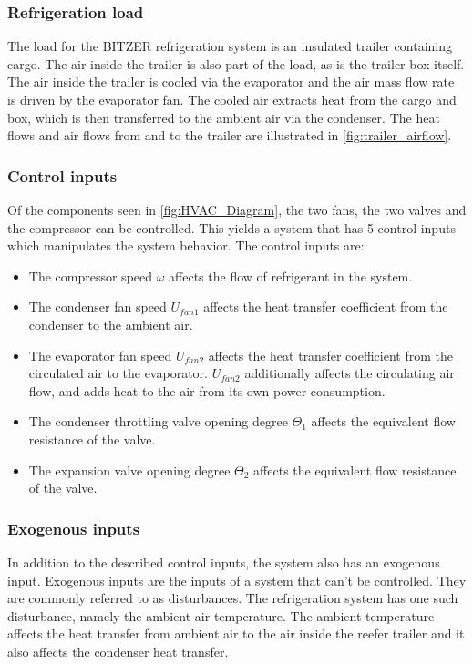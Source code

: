 \subsubsection{Refrigeration load}
The load for the BITZER refrigeration system is an insulated trailer containing cargo. The air inside the trailer is also part of the load, as is the trailer box itself. The air inside the trailer is cooled via the evaporator and the air mass flow rate is driven by the evaporator fan. The cooled air extracts heat from the cargo and box, which is then transferred to the ambient air via the condenser. The heat flows and air flows from and to the trailer are illustrated in \cref{fig:trailer_airflow}.

\subsubsection{Control inputs}
Of the components seen in \cref{fig:HVAC_Diagram}, the two fans, the two valves and the compressor can be controlled. This yields a system that has 5 control inputs which manipulates the system behavior. The control inputs are:
\begin{itemize}
	\item The compressor speed $ \omega $ affects the flow of refrigerant in the system.
	\item The condenser fan speed $ U_{fan1} $ affects the heat transfer coefficient from the condenser to the ambient air.
	\item The evaporator fan speed  $ U_{fan2} $ affects the heat transfer coefficient from the circulated air to the evaporator. $ U_{fan2} $ additionally affects the circulating air flow, and adds heat to the air from its own power consumption.
	\item The condenser throttling valve opening degree $ \Theta_1 $ affects the equivalent flow resistance of the valve.
	\item The expansion valve opening degree $ \Theta_2 $ affects the equivalent flow resistance of the valve.
\end{itemize}

\subsubsection{Exogenous inputs}
In addition to the described control inputs, the system also has an exogenous input.
Exogenous inputs are the inputs of a system that can't be controlled. They are commonly referred to as disturbances. The refrigeration system has one such disturbance, namely the ambient air temperature. The ambient temperature affects the heat transfer from ambient air to the air inside the reefer trailer and it also affects the condenser heat transfer.

